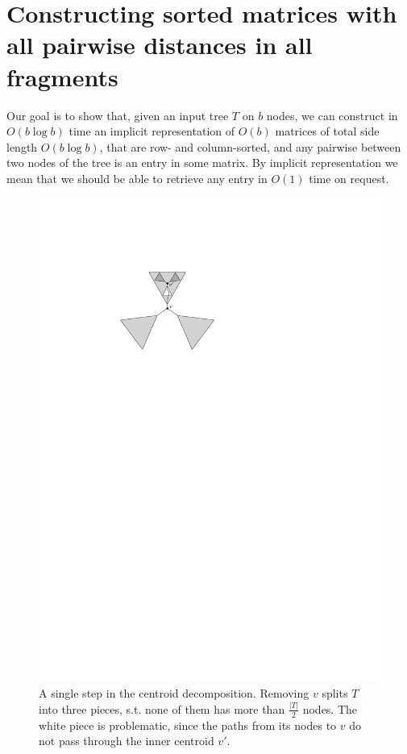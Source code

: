 \documentclass[a4paper,UKenglish]{lipics-v2016}
\theoremstyle{plain}
\begin{document}
\section{Constructing sorted matrices with all pairwise distances in all fragments}\label{appendix constructing sorted matrices using centroid decomp.}

Our goal is to show that, given an input tree $T$ on $b$ nodes, we can construct in $O(b\log b)$ time an implicit representation of $O(b)$
matrices of total side length $O(b\log b)$, that are row- and column-sorted, and any pairwise between two nodes of the tree is an entry in
some matrix. By implicit representation we mean that we should be able to retrieve any entry in $O(1)$ time on request.

\begin{figure}[ht]
\begin{center}
\includegraphics[scale=1]{centroid}
\end{center}
\caption{A single step in the centroid decomposition. Removing $v$ splits $T$ into three pieces, s.t. none of them has more than $\frac{|T|}{2}$ nodes. The white piece is problematic, since the paths from its nodes to $v$ do not pass through the inner centroid $v'$.}
\end{figure}
\end{document}

